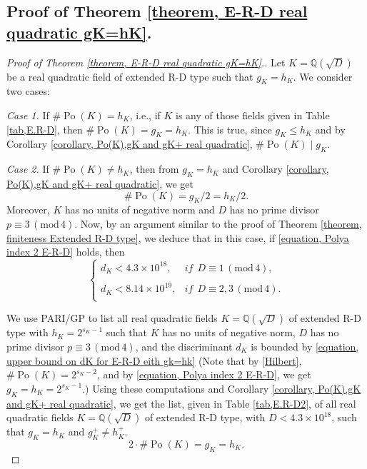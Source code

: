 \documentclass[12pt]{amsart}
\theoremstyle{definition}
\numberwithin{equation}{section}
\DeclareMathOperator{\Po}{Po}
\begin{document}
\subsection{Proof of Theorem \ref{theorem, E-R-D real quadratic gK=hK}.}
\begin{proof}[Proof of Theorem \ref{theorem, E-R-D real quadratic gK=hK}.]
Let $K=\mathbb{Q}(\sqrt{D})$ be a real quadratic field of extended R-D type such that $g_K=h_K$. We consider two cases:

\noindent
\emph{Case 1.} If $\#\Po(K)=h_K$, i.e., if $K$ is any of those fields given in Table \ref{tab,E.R-D}, then $	\# \Po(K)=g_K=h_K$. This is true, since $g_K \leq h_K$ and by Corollary \ref{corollary, Po(K),gK and gK+ real quadratic}, $\# \Po(K) \mid g_K$.

\noindent
\emph{Case 2.} If $\# \Po(K) \neq h_K$, then from $g_K=h_K$ and   Corollary \ref{corollary, Po(K),gK and gK+ real quadratic}, we get 
\begin{equation} \label{equation, Polya index 2 E-R-D}
	\# \Po(K)=g_K/2=h_K/2.
\end{equation}
Moreover, $K$ has no units of negative norm and $D$ has no prime divisor $p \equiv 3 \, (\mathrm{mod}\, 4)$. 
Now, by an argument similar to the proof of Theorem \ref{theorem, finiteness Extended R-D type}, we deduce that in this case, if \eqref{equation, Polya index 2 E-R-D} holds, then 
	\begin{equation}  \label{equation, upper bound on dK for E-R-D eith gk=hk}
	\left\{
	\begin{array}{ll}
		d_K < 4.3\times 10^{18}, & \textit{if} ~~ D \equiv 1 \, (\mathrm{mod}\, 4),\\
		& \\
		d_K < 8.14 \times 10^{19},  & \textit{if} ~~ D \equiv 2,3 \, (\mathrm{mod}\, 4).\\
	\end{array}
	\right.
\end{equation}

 We use PARI/GP to list all real quadratic fields $K=\mathbb{Q}(\sqrt{D})$ of extended R-D type  with $h_K=2^{s_K-1}$ such that $K$ has no units of negative norm, $D$ has no prime divisor $p \equiv 3 \, (\mathrm{mod}\, 4)$, and the discriminant $d_K$ is bounded by \eqref{equation, upper bound on dK for E-R-D eith gk=hk} (Note that by \eqref{Hilbert}, $\#\Po(K)=2^{s_K-2}$, and by \eqref{equation, Polya index 2 E-R-D}, we get $g_K=h_K=2^{s_K-1}$.) Using these computations and Corollary \ref{corollary, Po(K),gK and gK+ real quadratic}, we get the list, given  in Table \ref{tab,E.R-D2}, of all real quadratic fields $K=\mathbb{Q}(\sqrt{D})$ of extended R-D type, with $D < 4.3 \times 10^{18}$, such that $g_K=h_K$ and $g_K^+ \neq h_K^+$.
 	\iffalse
		\begin{equation*}
			2\cdot \# \Po(K)=g_K=h_K.
		\end{equation*}
	

\end{proof}
\end{document}

